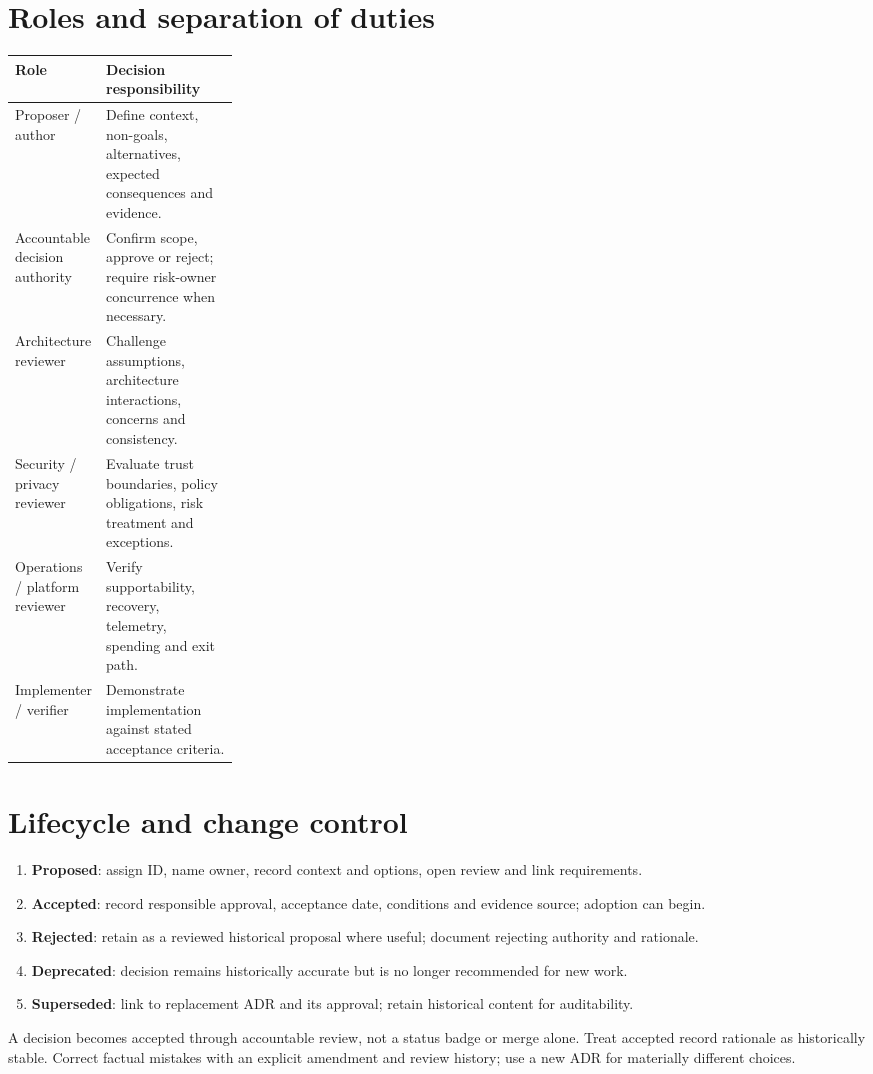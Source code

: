 \documentclass[11pt,letterpaper]{article}
\begin{document}
\section{Roles and separation of duties}
\begin{tabularx}{\linewidth}{@{}p{0.26\linewidth}X@{}}
\toprule
\textbf{Role} & \textbf{Decision responsibility}\\
\midrule
Proposer / author & Define context, non-goals, alternatives, expected consequences and evidence.\\
Accountable decision authority & Confirm scope, approve or reject; require risk-owner concurrence when necessary.\\
Architecture reviewer & Challenge assumptions, architecture interactions, concerns and consistency.\\
Security / privacy reviewer & Evaluate trust boundaries, policy obligations, risk treatment and exceptions.\\
Operations / platform reviewer & Verify supportability, recovery, telemetry, spending and exit path.\\
Implementer / verifier & Demonstrate implementation against stated acceptance criteria.\\
\bottomrule
\end{tabularx}

\section{Lifecycle and change control}
\begin{enumerate}
\item \textbf{Proposed}: assign ID, name owner, record context and options, open review and link requirements.
\item \textbf{Accepted}: record responsible approval, acceptance date, conditions and evidence source; adoption can begin.
\item \textbf{Rejected}: retain as a reviewed historical proposal where useful; document rejecting authority and rationale.
\item \textbf{Deprecated}: decision remains historically accurate but is no longer recommended for new work.
\item \textbf{Superseded}: link to replacement ADR and its approval; retain historical content for auditability.
\end{enumerate}
A decision becomes accepted through accountable review, not a status
badge or merge alone. Treat accepted record rationale as historically
stable. Correct factual mistakes with an explicit amendment and review
history; use a new ADR for materially different choices.
\end{document}
